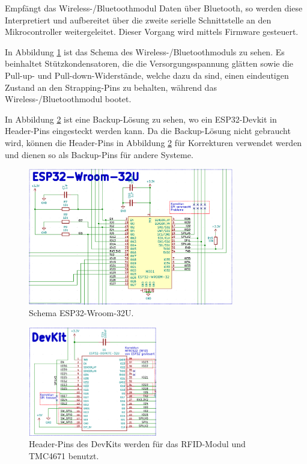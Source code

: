 Empfängt das Wireless-/Bluetoothmodul Daten über Bluetooth, so werden diese Interpretiert und aufbereitet über die zweite serielle Schnittstelle an den Mikrocontroller weitergeleitet. Dieser Vorgang wird mittels Firmware gesteuert.

In Abbildung \ref{fig:Schema_ESP32} ist das Schema des Wireless-/Bluetoothmoduls zu sehen. Es beinhaltet Stützkondensatoren, die die Versorgungsspannung glätten sowie die Pull-up- und Pull-down-Widerstände, welche dazu da sind, einen eindeutigen Zustand an den Strapping-Pins zu behalten, während das Wireless-/Bluetoothmodul bootet.

In Abbildung \ref{fig:Schema_ESP32_Devkit} ist eine Backup-Lösung zu sehen, wo ein ESP32-Devkit in Header-Pins eingesteckt werden kann. Da die Backup-Lösung nicht gebraucht wird, können die Header-Pins in Abbildung \ref{fig:Schema_ESP32_Devkit} für Korrekturen verwendet werden und dienen so als Backup-Pins für andere Systeme.

\begin{figure}[H]
	\centering
	\includegraphics[width=0.8\textwidth]{graphics/Schema_ESP32}
	\caption{Schema ESP32-Wroom-32U.}
	\label{fig:Schema_ESP32}
\end{figure}

\begin{figure}[H]
	\centering
	\includegraphics[width=0.5\textwidth]{graphics/Schema_ESP32_Devkit}
	\caption{Header-Pins des DevKits werden für das RFID-Modul und TMC4671 benutzt.}
	\label{fig:Schema_ESP32_Devkit}
\end{figure}

